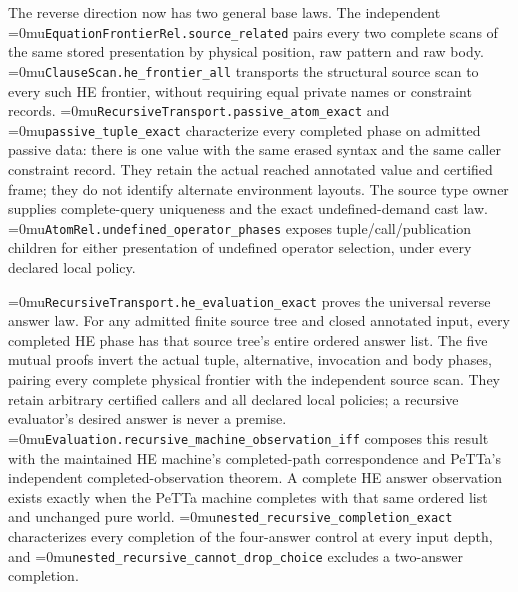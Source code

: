 \documentclass[11pt,a4paper]{article}
\newcommand{\name}[1]{\textup{\Urlmuskip=0mu\relax\nolinkurl{#1}}}
\begin{document}
The reverse direction now has two general base laws. The independent
\name{EquationFrontierRel.source\_related} pairs every two complete scans
of the same stored presentation by physical position, raw pattern and raw
body. \name{ClauseScan.he\_frontier\_all} transports the structural source
scan to every such HE frontier, without requiring equal private names or
constraint records. \name{RecursiveTransport.passive\_atom\_exact} and
\name{passive\_tuple\_exact} characterize every completed phase on admitted
passive data: there is one value with the same erased syntax and the same
caller constraint record. They retain the actual reached annotated value
and certified frame; they do not identify alternate environment layouts.
The source type owner supplies complete-query uniqueness and the exact
undefined-demand cast law. \name{AtomRel.undefined\_operator\_phases}
exposes tuple/call/publication children for either presentation of undefined
operator selection, under every declared local policy.

\name{RecursiveTransport.he\_evaluation\_exact} proves the universal reverse
answer law. For any admitted finite source tree and closed annotated input,
every completed HE phase has that source tree's entire ordered answer list.
The five mutual proofs invert the actual tuple, alternative, invocation and
body phases, pairing every complete physical frontier with the independent
source scan. They retain arbitrary certified callers and all declared local
policies; a recursive evaluator's desired answer is never a premise.
\name{Evaluation.recursive\_machine\_observation\_iff} composes this result
with the maintained HE machine's completed-path correspondence and PeTTa's
independent completed-observation theorem. A complete HE answer observation
exists exactly when the PeTTa machine completes with that same ordered list
and unchanged pure world. \name{nested\_recursive\_completion\_exact}
characterizes every completion of the four-answer control at every input
depth, and \name{nested\_recursive\_cannot\_drop\_choice} excludes a
two-answer completion.
\end{document}
